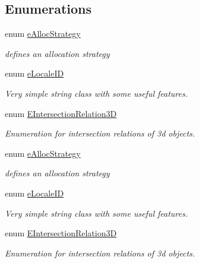 \subsection*{Enumerations}
\begin{DoxyCompactItemize}
\item 
\mbox{\label{namespaceirr_1_1core_aa2e91971d5e6e84de235bfabe3c7adba}} 
enum \hyperlink{namespaceirr_1_1core_aa2e91971d5e6e84de235bfabe3c7adba}{e\+Alloc\+Strategy} \begin{DoxyCompactList}\small\item\em defines an allocation strategy \end{DoxyCompactList}
\item 
enum \hyperlink{namespaceirr_1_1core_a4682709540c80568b555acc36dbf3a4a}{e\+Locale\+ID} \begin{DoxyCompactList}\small\item\em Very simple string class with some useful features. \end{DoxyCompactList}
\item 
\mbox{\label{namespaceirr_1_1core_a8a9999eb0d151083f48afe5f7d17a96c}} 
enum \hyperlink{namespaceirr_1_1core_a8a9999eb0d151083f48afe5f7d17a96c}{E\+Intersection\+Relation3D} \begin{DoxyCompactList}\small\item\em Enumeration for intersection relations of 3d objects. \end{DoxyCompactList}
\item 
\mbox{\label{namespaceirr_1_1core_aa2e91971d5e6e84de235bfabe3c7adba}} 
enum \hyperlink{namespaceirr_1_1core_aa2e91971d5e6e84de235bfabe3c7adba}{e\+Alloc\+Strategy} \begin{DoxyCompactList}\small\item\em defines an allocation strategy \end{DoxyCompactList}
\item 
enum \hyperlink{namespaceirr_1_1core_a4682709540c80568b555acc36dbf3a4a}{e\+Locale\+ID} \begin{DoxyCompactList}\small\item\em Very simple string class with some useful features. \end{DoxyCompactList}
\item 
\mbox{\label{namespaceirr_1_1core_a8a9999eb0d151083f48afe5f7d17a96c}} 
enum \hyperlink{namespaceirr_1_1core_a8a9999eb0d151083f48afe5f7d17a96c}{E\+Intersection\+Relation3D} \begin{DoxyCompactList}\small\item\em Enumeration for intersection relations of 3d objects. \end{DoxyCompactList}
\end{DoxyCompactItemize}
